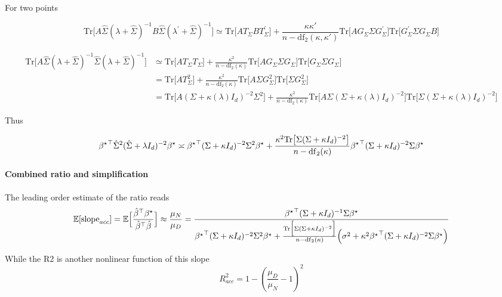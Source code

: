 \begin{minipage}[t]{1\columnwidth}
For two points

\[
\mbox{Tr}\Big[A\hat{\Sigma}(\lambda+\hat{\Sigma})^{-1}B\hat{\Sigma}(\lambda^{\prime}+\hat{\Sigma})^{-1}\Big]\simeq\mbox{Tr}\big[AT_{\Sigma}BT_{\Sigma}^{\prime}\big]+\frac{\kappa\kappa'}{n-\mathrm{df}_{2}(\kappa,\kappa')}\mbox{Tr}\big[AG_{\Sigma}\Sigma G_{\Sigma}^{\prime}\big]\mbox{Tr}\big[G_{\Sigma}^{\prime}\Sigma G_{\Sigma}B\big]
\]

\begin{align*}
\mbox{Tr}\Big[A\hat{\Sigma}(\lambda+\hat{\Sigma})^{-1}\hat{\Sigma}(\lambda+\hat{\Sigma})^{-1}\Big] & \simeq\mbox{Tr}\big[AT_{\Sigma}T_{\Sigma}\big]+\frac{\kappa^{2}}{n-\mathrm{df}_{2}(\kappa)}\mbox{Tr}\big[AG_{\Sigma}\Sigma G_{\Sigma}\big]\mbox{Tr}\big[G_{\Sigma}\Sigma G_{\Sigma}\big]\\
 & =\mbox{Tr}\big[AT_{\Sigma}^{2}\big]+\frac{\kappa^{2}}{n-\mathrm{df}_{2}(\kappa)}\mbox{Tr}\big[A\Sigma G_{\Sigma}^{2}\big]\mbox{Tr}\big[\Sigma G_{\Sigma}^{2}\big]\\
 & =\mbox{Tr}\big[A(\Sigma+\kappa(\lambda)I_{d})^{-2}\Sigma^{2}\big]+\frac{\kappa^{2}}{n-\mathrm{df}_{2}(\kappa)}\mbox{Tr}\big[A\Sigma(\Sigma+\kappa(\lambda)I_{d})^{-2}\big]\mbox{Tr}\big[\Sigma(\Sigma+\kappa(\lambda)I_{d})^{-2}\big]
\end{align*}

Thus

\[
{{\beta^{\star}}}^{\top}\hat{\Sigma}^{2}(\hat{\Sigma}+\lambda I_{d})^{-2}{\beta^{\star}}\asymp{{\beta^{\star}}}^{\top}(\Sigma+\kappa I_{d})^{-2}\Sigma^{2}{\beta^{\star}}+\frac{\kappa^{2}\mbox{Tr}\big[\Sigma(\Sigma+\kappa I_{d})^{-2}\big]}{n-\mathrm{df}_{2}(\kappa)}{{\beta^{\star}}}^{\top}(\Sigma+\kappa I_{d})^{-2}\Sigma{\beta^{\star}}
\]
%
\end{minipage}

\paragraph{Combined ratio and simplification}

The leading order estimate of the ratio reads
\[
\mathbb{E}[\mathrm{slope}_{acc}]=\mathbb{E}\Big[\frac{{\hat{\beta}}^{\top}{\beta^{\star}}}{{\hat{\beta}}^{\top}\hat{\beta}}\Big]\approx\frac{\mu_{N}}{\mu_{D}}=\frac{{{\beta^{\star}}}^{\top}(\Sigma+\kappa I_{d})^{-1}\Sigma{\beta^{\star}}}{{{\beta^{\star}}}^{\top}(\Sigma+\kappa I_{d})^{-2}\Sigma^{2}{\beta^{\star}}+\frac{\mathrm{Tr}\Big[\Sigma(\Sigma+\kappa I_{d})^{-2}\Big]}{n-\mathrm{df}_{2}(\kappa)}\Big(\sigma^{2}+\kappa^{2}{{\beta^{\star}}}^{\top}(\Sigma+\kappa I_{d})^{-2}\Sigma{\beta^{\star}}\Big)}
\]

While the R2 is another nonlinear function of this slope
\[
R_{acc}^{2}=1-(\frac{\mu_{D}}{\mu_{N}}-1)^{2}
\]

